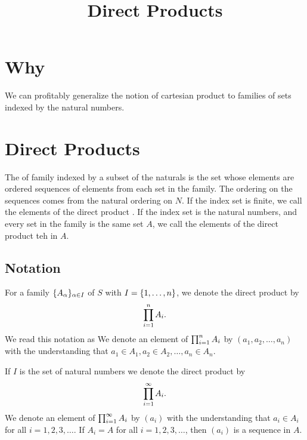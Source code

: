 







\title{Direct Products}

\section{Why}

We can profitably generalize the notion of cartesian product to families of sets indexed by the natural numbers.

\section{Direct Products}

The  of family indexed by a subset of the naturals is the set whose elements are ordered sequences of elements from each set in the family.
The ordering on the sequences comes from the natural ordering on $N$.
If the index set is finite, we call the elements of the direct product .
If the index set is the natural numbers, and every set in the family is the same set $A$, we call the elements of the direct product teh  in $A$.

\subsection{Notation}

For a family $\{A_{\alpha}\}_{\alpha \in I}$ of $S$ with $I = \{1, \dots, n\}$, we denote the direct product by
\[
  \prod_{i = 1}^{n} A_{i}.
\]
We read this notation as 
We denote an element of $\prod_{i = 1}^{n} A_{i}$ by $(a_1, a_2, \dots, a_n)$ with the understanding that $a_1 \in A_1, a_2 \in A_2, \dots, a_n \in A_n$.

If $I$ is the set of natural numbers we denote the direct product by
\[
  \prod_{i = 1}^{\infty} A_{i}.
\]
We denote an element of $\prod_{i = 1}^{\infty} A_{i}$ by $(a_i)$ with the understanding that $a_i \in A_i$ for all $i = 1,2,3,\dots$.
If $A_i = A$ for all $i = 1, 2, 3,\dots$, then $(a_i)$ is a sequence in $A$.


